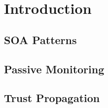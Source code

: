 \section{Introduction}
\subsection{SOA Patterns}
\subsection{Passive Monitoring}
\subsection{Trust Propagation}
